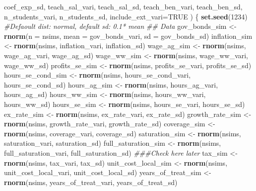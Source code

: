 \documentclass[]{article}
\newenvironment{Shaded}{\begin{snugshade}}{\end{snugshade}}
\newcommand{\CommentTok}[1]{\textcolor[rgb]{0.56,0.35,0.01}{\textit{#1}}}
\newcommand{\DataTypeTok}[1]{\textcolor[rgb]{0.13,0.29,0.53}{#1}}
\newcommand{\DecValTok}[1]{\textcolor[rgb]{0.00,0.00,0.81}{#1}}
\newcommand{\KeywordTok}[1]{\textcolor[rgb]{0.13,0.29,0.53}{\textbf{#1}}}
\newcommand{\NormalTok}[1]{#1}
\newcommand{\OtherTok}[1]{\textcolor[rgb]{0.56,0.35,0.01}{#1}}
\newcommand{\StringTok}[1]{\textcolor[rgb]{0.31,0.60,0.02}{#1}}
\begin{document}
\begin{Shaded}
\begin{Highlighting}[]
\NormalTok{                      coef_exp_sd,}
\NormalTok{                      teach_sal_vari,}
\NormalTok{                      teach_sal_sd,}
\NormalTok{                      teach_ben_vari,}
\NormalTok{                      teach_ben_sd,}
\NormalTok{                      n_students_vari,}
\NormalTok{                      n_students_sd, }
                      \DataTypeTok{include_ext_vari=}\OtherTok{TRUE}
\NormalTok{    ) \{}
      \KeywordTok{set.seed}\NormalTok{(}\DecValTok{1234}\NormalTok{)}
      \CommentTok{#Defaoult dist: normal, default sd: 0.1* mean}
      \CommentTok{## Data }
\NormalTok{      gov_bonds_sim <-}\StringTok{ }\KeywordTok{rnorm}\NormalTok{(}\DataTypeTok{n =}\NormalTok{ nsims, }\DataTypeTok{mean =}\NormalTok{ gov_bonds_vari, }\DataTypeTok{sd =}\NormalTok{ gov_bonds_sd)   }
\NormalTok{      inflation_sim <-}\StringTok{ }\KeywordTok{rnorm}\NormalTok{(nsims, inflation_vari, inflation_sd)}
\NormalTok{      wage_ag_sim <-}\StringTok{ }\KeywordTok{rnorm}\NormalTok{(nsims, wage_ag_vari, wage_ag_sd)}
\NormalTok{      wage_ww_sim <-}\StringTok{ }\KeywordTok{rnorm}\NormalTok{(nsims, wage_ww_vari, wage_ww_sd)}
\NormalTok{      profits_se_sim <-}\StringTok{ }\KeywordTok{rnorm}\NormalTok{(nsims, profits_se_vari, profits_se_sd)}
\NormalTok{      hours_se_cond_sim <-}\StringTok{ }\KeywordTok{rnorm}\NormalTok{(nsims, hours_se_cond_vari, hours_se_cond_sd)}
\NormalTok{      hours_ag_sim <-}\StringTok{ }\KeywordTok{rnorm}\NormalTok{(nsims, hours_ag_vari, hours_ag_sd)}
\NormalTok{      hours_ww_sim <-}\StringTok{ }\KeywordTok{rnorm}\NormalTok{(nsims, hours_ww_vari, hours_ww_sd)}
\NormalTok{      hours_se_sim <-}\StringTok{ }\KeywordTok{rnorm}\NormalTok{(nsims, hours_se_vari, hours_se_sd)}
\NormalTok{      ex_rate_sim <-}\StringTok{ }\KeywordTok{rnorm}\NormalTok{(nsims, ex_rate_vari, ex_rate_sd)}
\NormalTok{      growth_rate_sim <-}\StringTok{ }\KeywordTok{rnorm}\NormalTok{(nsims, growth_rate_vari, growth_rate_sd)}
\NormalTok{      coverage_sim <-}\StringTok{ }\KeywordTok{rnorm}\NormalTok{(nsims, coverage_vari, coverage_sd)}
\NormalTok{      saturation_sim <-}\StringTok{ }\KeywordTok{rnorm}\NormalTok{(nsims, saturation_vari, saturation_sd)}
\NormalTok{      full_saturation_sim <-}\StringTok{ }\KeywordTok{rnorm}\NormalTok{(nsims, full_saturation_vari, full_saturation_sd) }\CommentTok{###Check here later}
\NormalTok{      tax_sim <-}\StringTok{ }\KeywordTok{rnorm}\NormalTok{(nsims, tax_vari, tax_sd)}
\NormalTok{      unit_cost_local_sim <-}\StringTok{ }\KeywordTok{rnorm}\NormalTok{(nsims, unit_cost_local_vari, unit_cost_local_sd)}
\NormalTok{      years_of_treat_sim <-}\StringTok{ }\KeywordTok{rnorm}\NormalTok{(nsims, years_of_treat_vari, years_of_treat_sd)}
      

\end{Highlighting}
\end{Shaded}
\end{document}
